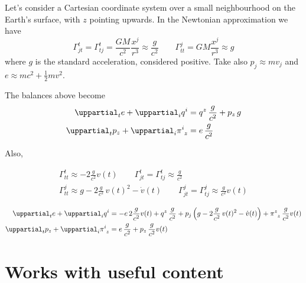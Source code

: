 \documentclass[\ifafour a4paper,12pt,\else a5paper,10pt,\fi%
onecolumn,oneside,article,%
british%
]{memoir}
\theoremstyle{remark}
\theoremstyle{innote}
\newcommand*{\de}{\uppartial}%
\renewcommand*{\|}[1][]{\nonscript\:#1\vert\nonscript\:\mathopen{}}
\newcommand*{\sect}{\S}%
\renewcommand*{\i}{{}\indices}
\begin{document}
Let's consider a Cartesian coordinate system over a small neighbourhood on the Earth's surface, with $z$ pointing upwards. In the Newtonian approximation we have \autocites[\sect\,5.2.3]{poissonetal2014}
\begin{equation}
  \label{eq:christof_newt}
  \varGamma^{t}_{jt}=\varGamma^{t}_{tj} =
    \frac{GM}{c^{2}}\frac{x^{j}}{r^{3}} \approx \frac{g}{c^{2}}
  \qquad\varGamma^{j}_{tt} = GM\frac{x^{j}}{r^{3}} \approx g
\end{equation}
where $g$ is the standard acceleration, considered positive. Take also $p_{j} \approx m v_{j}$ and $e\approx m c^{2} + \frac{1}{2}mv^{2}$.



The balances above become
\begin{align}
  \label{eq:div_e_appr}
  \de_{t}e + \de_{i}q^{i} &=
  q^{z}\, \frac{g}{c^{2}}
  +p_{z}\, g
  \\
  \label{eq:div_p_appr}
  \de_{t}p_{z} +  \de_{i}\pi\i{^{i}_{z}} &=
  e\,\frac{g}{c^{2}}
\end{align}

Also,

\begin{equation}
  \label{eq:christof_body}
  \begin{gathered}
    \varGamma^{t}_{tt} \approx
    -2\frac{g}{c^{2}} v(t)
    \qquad
    \varGamma^{t}_{jt}=\varGamma^{t}_{tj}
    \approx \frac{g}{c^{2}}
    \\
    \varGamma^{j}_{tt} \approx
    g - 2\frac{g}{c^{2}}\,v(t)^{2} - \dot{v}(t)
    \qquad
    \varGamma^{j}_{jt} = \varGamma^{j}_{tj} \approx
    \frac{g}{c^{2}} v(t)
  \end{gathered}
\end{equation}

\begin{align}
  \label{eq:div_e}
  \de_{t}e + \de_{i}q^{i} &=
  -e\,2\frac{g}{c^{2}} v(t)
  +q^{z}\, \frac{g}{c^{2}}
  +p_{j}\, \Bigl(g - 2\frac{g}{c^{2}}\,v(t)^{2} - \dot{v}(t)\Bigr)
  +\pi\i{^{z}_{z}}\, \frac{g}{c^{2}} v(t)
  \\
  \label{eq:div_p}
  \de_{t}p_{z} +  \de_{i}\pi\i{^{i}_{z}} &=
  e\, \frac{g}{c^{2}}
  +p_{z}\,\frac{g}{c^{2}} v(t)
\end{align}


\section{Works with useful content}
\label{sec:works}
\end{document}
